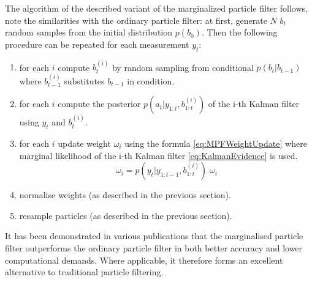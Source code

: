 The algorithm of the described variant of the marginalized particle filter follows, note the
similarities with the ordinary particle filter: at first, generate \(N\) \(b_t\) random samples from
the initial distribution \(p(b_0)\). Then the following procedure can be repeated for each measurement
\(y_t\):
\begin{enumerate}
	\item for each \(i\) compute \(b_t^{(i)}\) by random sampling from conditional {\pdf}
		\(p(b_t|b_{t-1})\) where \(b_{t-1}^{(i)}\) substitutes \(b_{t-1}\) in condition.
	\item for each \(i\) compute the posterior {\pdf} \(p(a_t|y_{1:t},b_{1:t}^{(i)})\) of the i-th
		Kalman filter using \(y_t\) and \(b_t^{(i)}\).
	\item for each \(i\) update weight \(\omega_i\) using the formula \eqref{eq:MPFWeightUpdate} where
		marginal likelihood of the i-th Kalman filter \eqref{eq:KalmanEvidence} is used.
		\begin{equation} \label{eq:MPFWeightUpdate}
			\omega_i = p(y_t|y_{1:t-1},b_{1:t}^{(i)}) \; \omega_i
		\end{equation}
	\item normalise weights (as described in the previous section).
	\item resample particles (as described in the previous section).
\end{enumerate}

It has been demonstrated in various publications that the marginalised particle filter outperforms
the ordinary particle filter in both better accuracy and lower computational demands. Where
applicable, it therefore forms an excellent alternative to traditional particle filtering.

